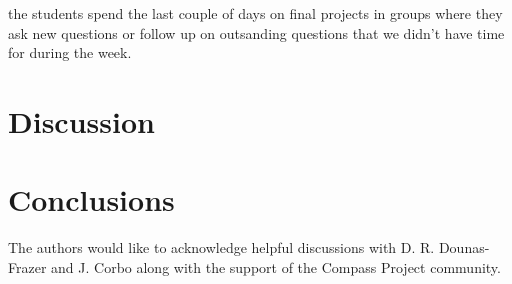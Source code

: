 \documentclass[aps,pre,10pt,superscriptaddress,showpacs,amsmath,amssymb,nofootinbib]{revtex4-1}
\begin{document}
the students spend the last couple of days on final projects in groups where
they ask new questions or follow up on outsanding questions that we didn't have
time for during the week.


\section{Discussion}




\section{Conclusions}



\acknowledgments The authors would like to acknowledge helpful discussions with
D. R. Dounas-Frazer and J. Corbo along with the support of the Compass Project
community.


\end{document}
